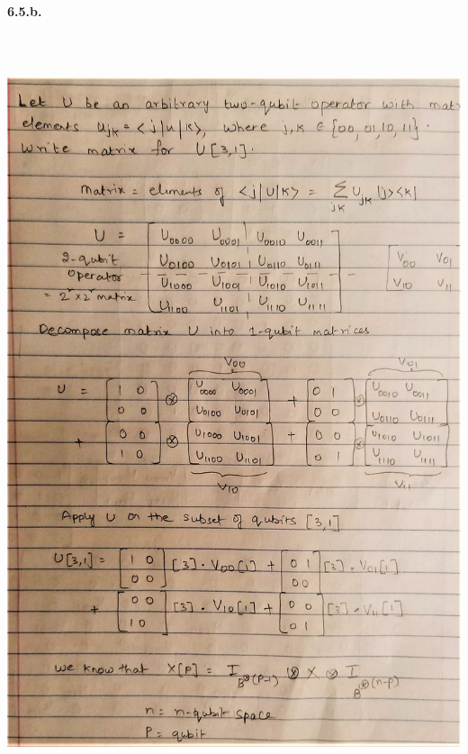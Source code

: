 \documentclass [12pt]{article}
\theoremstyle{definition}
\begin{document}
\newpage

{\bf 6.5.b.}\\
\includegraphics[width=18cm, height=23cm]{I11}\\
\end{document}
